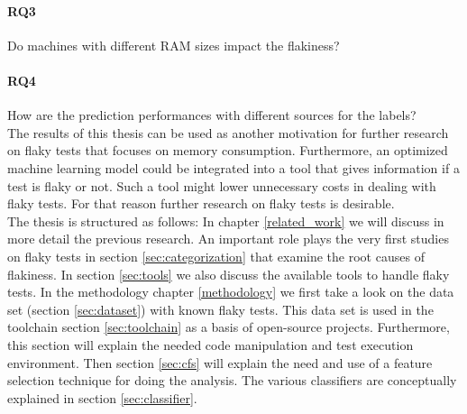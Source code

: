 \documentclass{seal_thesis}
\begin{document}
\paragraph{RQ3} Do machines with different RAM sizes impact the flakiness?

\paragraph{RQ4} How are the prediction performances with different sources for the labels? \\

\noindent The results of this thesis can be used as another motivation for further research on flaky tests that focuses on memory consumption. Furthermore, an optimized machine learning model could be integrated into a tool that gives information if a test is flaky or not. Such a tool might lower unnecessary costs in dealing with flaky tests. For that reason further research on flaky tests is desirable. \\

\noindent The thesis is structured as follows: In chapter \ref{related_work} we will discuss in more detail the previous research. An important role plays the very first studies on flaky tests in section \ref{sec:categorization} that examine the root causes of flakiness. In section \ref{sec:tools} we also discuss the available tools to handle flaky tests. In the methodology chapter \ref{methodology} we first take a look on the data set (section \ref{sec:dataset}) with known flaky tests. This data set is used in the toolchain section \ref{sec:toolchain} as a basis of open-source projects. Furthermore, this section will explain the needed code manipulation and test execution environment. Then section \ref{sec:cfs} will explain the need and use of a feature selection technique for doing the analysis. The various classifiers are conceptually explained in section \ref{sec:classifier}.




%

%
\end{document}
